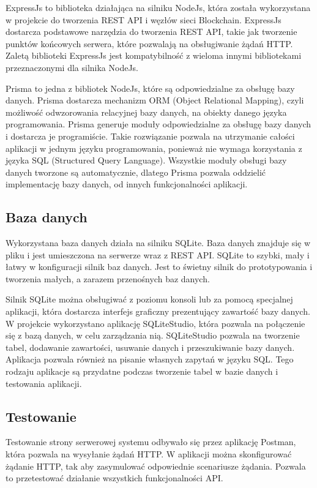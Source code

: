 \documentclass[a4paper,12pt]{book}
\begin{document}
ExpressJs to biblioteka działająca na silniku NodeJs, która została wykorzystana w projekcie do tworzenia REST API i węzłów sieci Blockchain. ExpressJs dostarcza podstawowe narzędzia do tworzenia REST API, takie jak tworzenie punktów końcowych serwera, które pozwalają na obsługiwanie żądań HTTP. Zaletą biblioteki ExpressJs jest kompatybilność z wieloma innymi bibliotekami przeznaczonymi dla silnika NodeJs.

Prisma to jedna z bibliotek NodeJs, które są odpowiedzialne za obsługę bazy danych. Prisma dostarcza mechanizm ORM (Object Relational Mapping), czyli możliwość odwzorowania relacyjnej bazy danych, na obiekty danego języka programowania. Prisma generuje moduły odpowiedzialne za obsługę bazy danych i dostarcza je programiście. Takie rozwiązanie pozwala na utrzymanie całości aplikacji w jednym języku programowania, ponieważ nie wymaga korzystania z języka SQL (Structured Query Language). Wszystkie moduły obsługi bazy danych tworzone są automatycznie, dlatego Prisma pozwala oddzielić implementację bazy danych, od innych funkcjonalności aplikacji.

\subsection {Baza danych}

Wykorzystana baza danych działa na silniku SQLite. Baza danych znajduje się w pliku i jest umieszczona na serwerze wraz z REST API. SQLite to szybki, mały i łatwy w konfiguracji silnik baz danych. Jest to świetny silnik do prototypowania i tworzenia małych, a zarazem przenośnych baz danych.

Silnik SQLite można obsługiwać z poziomu konsoli lub za pomocą specjalnej aplikacji, która dostarcza interfejs graficzny prezentujący zawartość bazy danych. W projekcie wykorzystano aplikację SQLiteStudio, która pozwala na połączenie się z bazą danych, w celu zarządzania nią. SQLiteStudio pozwala na tworzenie tabel, dodawanie zawartości, usuwanie danych i przeszukiwanie bazy danych. Aplikacja pozwala również na pisanie własnych zapytań w języku SQL. Tego rodzaju aplikacje są przydatne podczas tworzenie tabel w bazie danych i testowania aplikacji.

\subsection{Testowanie}

Testowanie strony serwerowej systemu odbywało się przez aplikację Postman, która pozwala na wysyłanie żądań HTTP. W aplikacji można skonfigurować żądanie HTTP, tak aby zasymulować odpowiednie scenariusze żądania. Pozwala to przetestować działanie wszystkich funkcjonalności API.
\end{document}
